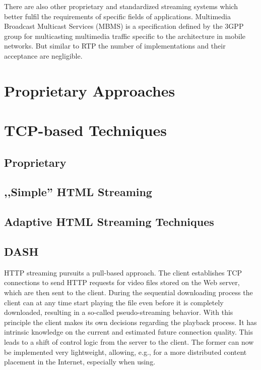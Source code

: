 There are also other proprietary and standardized streaming systems which better fulfil the requirements of specific fields of applications.  Multimedia Broadcast Multicast Services (MBMS)\cite{3gpp22.146,3gpp22.246} is a specification defined by the 3GPP group for multicasting multimedia traffic specific to the architecture in mobile networks. But similar to RTP the number of implementations and their acceptance are negligible.





\section{Proprietary Approaches}



\section{TCP-based Techniques}
\subsection{Proprietary}
\subsection{,,Simple'' HTML Streaming}
\subsection{Adaptive HTML Streaming Techniques}
\subsection{\ac{DASH}}



HTTP streaming pursuits a pull-based approach. The client establishes TCP connections to send HTTP requests for video files stored on the Web server, which are then sent to the client. During the sequential downloading process the client can at any time start playing the file even before it is completely downloaded, resulting in a so-called pseudo-streaming behavior.
With this principle the client makes its own decisions regarding the playback process. It has intrinsic knowledge on the current and estimated future connection quality. This leads to a shift of control logic from the server to the client. The former can now be implemented very lightweight, allowing, e.g., for a more distributed content placement in the Internet, especially when using.

